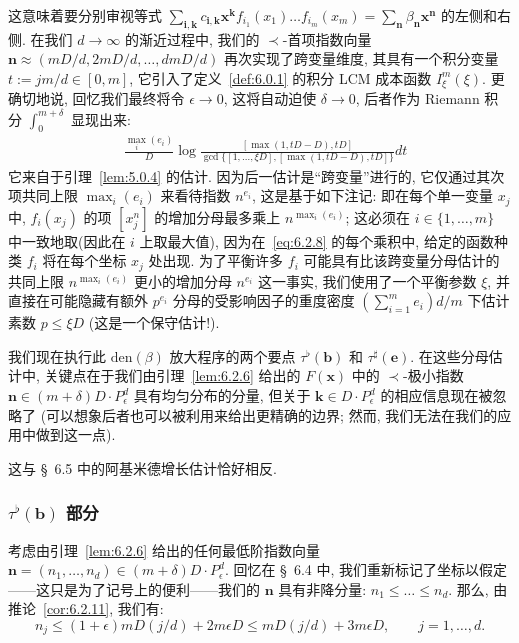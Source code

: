 这意味着要分别审视等式 $\sum_{\mathbf{i},\mathbf{k}} c_{\mathbf{i},\mathbf{k}} \mathbf{x}^{\mathbf{k}} f_{i_1}(x_1) \dots f_{i_m}(x_m) = \sum_{\mathbf{n}} \beta_{\mathbf{n}} \mathbf{x}^{\mathbf{n}}$ 的左侧和右侧.
在我们 $d \to \infty$ 的渐近过程中, 我们的 $\prec$-首项指数向量 $\mathbf{n} \approx (mD/d, 2mD/d, \dots, dmD/d)$ 再次实现了跨变量维度, 其具有一个积分变量 $t := jm/d \in [0, m]$, 它引入了定义~\ref{def:6.0.1} 的积分 LCM 成本函数 $I_{\xi}^m(\xi)$.
更确切地说, 回忆我们最终将令 $\epsilon \to 0$, 这将自动迫使 $\delta \to 0$, 后者作为 Riemann 积分 $\int_0^{m+\delta}$ 显现出来:
\[
\begin{aligned}
&\frac{\max_{i}(e_i)}{D} \log \frac{[\max(1, tD - D), tD]}{\gcd\{[1, \dots, \xi D], [\max(1, tD - D), tD]\}} dt
\end{aligned}
\]
它来自于引理~\ref{lem:5.0.4} 的估计.
因为后一估计是``跨变量''进行的, 它仅通过其次项共同上限 $\max_i(e_i)$ 来看待指数 $n^{e_i}$, 这是基于如下注记: 即在每个单一变量 $x_j$ 中, $f_i(x_j)$ 的项 $[x_j^n]$ 的增加分母最多乘上 $n^{\max_i(e_i)}$; 这必须在 $i \in \{1, \ldots, m\}$ 中一致地取(因此在 $i$ 上取最大值), 因为在~\eqref{eq:6.2.8} 的每个乘积中, 给定的函数种类 $f_i$ 将在每个坐标 $x_j$ 处出现.
为了平衡许多 $f_i$ 可能具有比该跨变量分母估计的共同上限 $n^{\max_i(e_i)}$ 更小的增加分母 $n^{e_i}$ 这一事实, 我们使用了一个平衡参数 $\xi$, 并直接在可能隐藏有额外 $p^{e_i}$ 分母的受影响因子的重度密度 $(\sum_{i=1}^m e_i) d/m$ 下估计素数 $p \leq \xi D$ (这是一个保守估计!).

我们现在执行此 $\mathrm{den}(\beta)$ 放大程序的两个要点 $\tau^{\flat}(\mathbf{b})$ 和 $\tau^{\sharp}(\mathbf{e})$.
在这些分母估计中, 关键点在于我们由引理~\ref{lem:6.2.6} 给出的 $F(\mathbf{x})$ 中的 $\prec$-极小指数 $\mathbf{n} \in (m+\delta)D \cdot P^d_{\epsilon}$ 具有均匀分布的分量, 但关于 $\mathbf{k} \in D \cdot P^d_{\epsilon}$ 的相应信息现在被忽略了 (可以想象后者也可以被利用来给出更精确的边界; 然而, 我们无法在我们的应用中做到这一点).

这与 \S~6.5 中的阿基米德增长估计恰好相反.

\subsubsection{$\tau^{\flat}(\mathbf{b})$ 部分}\label{sec:6.6.2}

考虑由引理~\ref{lem:6.2.6} 给出的任何最低阶指数向量 $\mathbf{n} = (n_1, \dots, n_d) \in (m + \delta)D \cdot P_{\epsilon}^d$.
回忆在 \S~6.4 中, 我们重新标记了坐标以假定——这只是为了记号上的便利——我们的 $\mathbf{n}$ 具有非降分量: $n_1 \leq \dots \leq n_d$.
那么, 由推论~\ref{cor:6.2.11}, 我们有:
\begin{equation}\label{eq:6.6.3}
n_j \le (1+\epsilon)mD(j/d) + 2m\epsilon D \le mD(j/d) + 3m\epsilon D, \qquad j = 1, \dots, d.
\end{equation}

